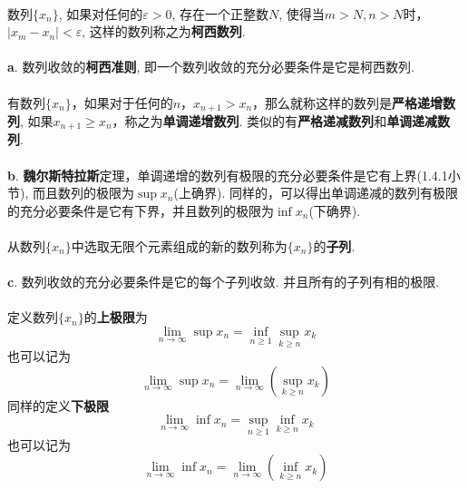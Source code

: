 \paragraph{}
数列$\{x_n\}$, 如果对任何的$\varepsilon > 0$, 存在一个正整数$N$, 使得当$m > N, n > N$时，$|x_m - x_n| < \varepsilon$, 这样的数列称之为\textbf{柯西数列}.

\paragraph{}
\textbf{a}. 数列收敛的\textbf{柯西准则}, 即一个数列收敛的充分必要条件是它是柯西数列.

\paragraph{}
有数列$\{x_n\}$，如果对于任何的$n$，$x_{n+1} > x_n$，那么就称这样的数列是\textbf{严格递增数列}, 如果$x_{n+1} \geq x_n$，称之为\textbf{单调递增数列}. 类似的有\textbf{严格递减数列}和\textbf{单调递减数列}.

\paragraph{}
\textbf{b}. \textbf{魏尔斯特拉斯}定理，单调递增的数列有极限的充分必要条件是它有上界(1.4.1小节), 而且数列的极限为$\sup{x_n}$(上确界). 
同样的，可以得出单调递减的数列有极限的充分必要条件是它有下界，并且数列的极限为$\inf{x_n}$(下确界).

\paragraph{}
从数列$\{x_n\}$中选取无限个元素组成的新的数列称为$\{x_n\}$的\textbf{子列}.

\paragraph{}
\textbf{c}. 数列收敛的充分必要条件是它的每个子列收敛. 并且所有的子列有相的极限.

\paragraph{}
定义数列$\{x_n\}$的\textbf{上极限}为
$$
\lim_{n\to \infty} \sup{x_n} = \inf_{n \geq 1} \sup_{k \geq n} x_k 
$$
也可以记为
$$
\lim_{n\to \infty} \sup{x_n}  = \lim_{n\to \infty}(\sup_{k\geq n} x_k)
$$
同样的定义\textbf{下极限}
$$
\lim_{n\to \infty} \inf{x_n} = \sup_{n \geq 1} \inf_{k \geq n} x_k 
$$
也可以记为
$$
\lim_{n\to \infty} \inf{x_n}  = \lim_{n\to \infty}(\inf_{k\geq n} x_k)
$$

